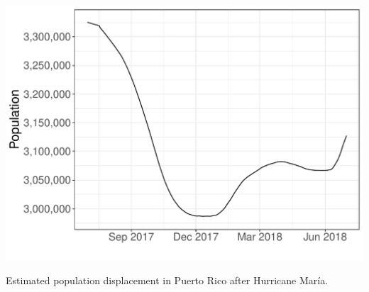 \documentclass[11pt]{article}
\begin{document}
\begin{suppfigure}[ht]
	\centering
	\includegraphics[width=0.70\linewidth]{figs/supp-figure-8.pdf} 
	\caption{Estimated population displacement in Puerto Rico after Hurricane Mar\'ia.}
	\label{supp-fig:pop-displacement-pr}
\end{suppfigure}
\end{document}
